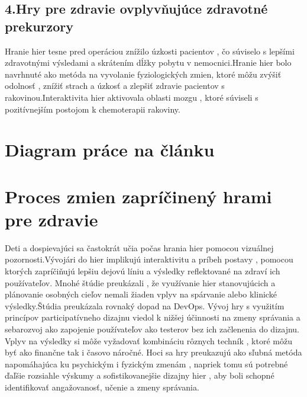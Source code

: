 \documentclass[10pt,oneside,slovak,a4paper]{article}
\begin{document}
\subsection{4.Hry pre zdravie ovplyvňujúce zdravotné prekurzory}
Hranie hier tesne pred operáciou znížilo úzkosti pacientov , čo súviselo s lepšími zdravotnými výsledami a skrátením dĺžky pobytu v nemocnici.Hranie hier bolo navrhnuté ako metóda na vyvolanie fyziologických zmien, ktoré môžu zvýšiť odolnosť , znížiť strach a úzkosť a zlepšiť zdravie pacientov s rakovinou.Interaktivita hier aktivovala oblasti mozgu , ktoré súviseli s pozitívnejším postojom k chemoterapii rakoviny.
\section{Diagram práce na článku}

\section{Proces zmien zapríčinený hrami pre zdravie}
Deti a dospievajúci sa častokrát učia počas hrania hier pomocou vizuálnej pozornosti.Vývojári do hier implikujú interaktivitu a príbeh postavy , pomocou ktorých zapríčiňujú lepšiu dejovú líniu a výsledky reflektované na zdraví ich používateľov. Mnohé štúdie preukázali , že využívanie hier stanovujúcich a plánovanie osobných cieľov nemali žiaden vplyv na spárvanie alebo klinické výsledky.Štúdia preukázala rovnaký dopad na DevOps. Vývoj hry s využitím princípov \cite{Coplien:MPD}participatívneho dizajnu viedol k nižšej účinnosti na zmeny správania a sebarozvoj ako zapojenie používateľov ako testerov bez ich začlenenia do dizajnu. Vplyv na výsledky si môže vyžadovať kombináciu rôznych techník , ktoré môžu byť ako finančne tak i časovo náročné. Hoci sa hry preukazujú ako sľubná metóda napomáhajúca ku psychickým i fyzickým zmenám , napriek tomu sú potrebné ďaľšie rozsiahle výskumy a sofistikovanejšie dizajny hier , aby boli schopné identifikovať angažovanosť, učenie a zmeny správania. 
\end{document}

